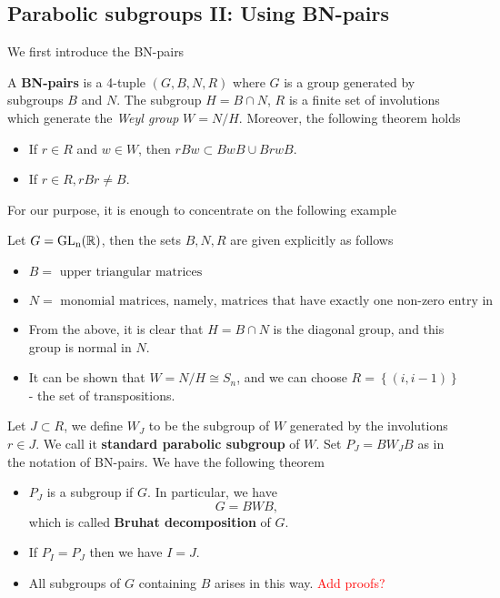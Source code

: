 \subsection{Parabolic subgroups II: Using BN-pairs}
We first introduce the BN-pairs
\begin{definition}[BN-pairs]
    A \textbf{BN-pairs} is a 4-tuple $(G,B,N,R)$ where $G$ is a group generated by subgroups $B$ and $N$.
    The subgroup $H = B \cap N$, $R$ is a finite set of involutions which generate the \textit{Weyl group} $W= N/H$. Moreover,
    the following theorem holds
    \begin{itemize}
        \item If $ r \in R$ and $w \in W$, then $rBw \subset BwB \cup BrwB$.
        \item If $r \in R, rBr \ne B$.
    \end{itemize}
\end{definition}
For our purpose, it is enough to concentrate on the following example
\begin{example}
    Let $G = \operatorname{\text{GL}_n(\mathbb{R})}$, then the sets $B,N,R$ are given explicitly as follows
    \begin{itemize}
        \item $B = \text{ upper triangular matrices}$
        \item $N = \text{ monomial matrices, namely, matrices that have exactly one non-zero entry in each row and column}$
        \item From the above, it is clear that $H = B \cap N$ is the diagonal group, and this group is normal in $N$.
        \item It can be shown that $W = N/H \cong S_n$, and we can choose $R = \left\lbrace (i,i-1)\right\rbrace $ - the set of transpositions.
    \end{itemize}
\end{example}
Let $J \subset R$, we define $W_J$ to be the subgroup of $W$ generated by the involutions
$r \in J$. We call it \textbf{standard parabolic subgroup} of $W$. Set $P_J = BW_JB$ as in the notation of
BN-pairs. We have the following theorem
\begin{theorem}
    \hfill
    \begin{itemize}
        \item $P_J$ is a subgroup if $G$. In particular, we have
              \[G = BWB,\]
              which is called \textbf{Bruhat decomposition} of $G$.
        \item If $P_I=P_J$ then we have $I=J$.
        \item All subgroups of $G$ containing $B$ arises in this way. \textcolor{red}{Add proofs?}
    \end{itemize}
\end{theorem}
